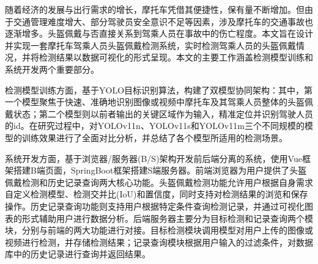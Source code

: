 随着经济的发展与出行需求的增长，摩托车凭借其便捷性，保有量不断增加。但由于交通管理难度增大、部分驾驶员安全意识不足等因素，涉及摩托车的交通事故也逐渐增多。头盔佩戴与否直接关系到驾乘人员在事故中的伤亡程度。本文旨在设计并实现一套摩托车驾乘人员头盔佩戴检测系统，实时检测驾乘人员的头盔佩戴情况，并将检测结果以数据可视化的形式呈现。本文的主要工作涵盖检测模型训练和系统开发两个重要部分。

检测模型训练方面，基于YOLO目标识别算法，构建了双模型协同架构：其中，第一个模型聚焦于快速、准确地识别图像或视频中摩托车及其驾乘人员整体的头盔佩戴状态；第二个模型则以前者输出的关键区域作为输入，精准定位并识别驾驶人员的id。在研究过程中，对YOLOv11n、YOLOv11s和YOLOv11m三个不同规模的模型的训练效果进行了全面对比分析，并总结了各个模型所适用的检测场景。

系统开发方面，基于浏览器/服务器(B/S)架构开发前后端分离的系统，使用Vue框架搭建B端页面，SpringBoot框架搭建S端服务器。前端浏览器为用户提供了头盔佩戴检测和历史记录查询两大核心功能。头盔佩戴检测功能允许用户根据自身需求自定义检测模型、检测交并比(IoU)和置信度，同时支持对检测结果的浏览和保存操作。历史记录查询功能则支持用户根据特定条件查询检测记录，并通过可视化图表的形式辅助用户进行数据分析。后端服务器主要分为目标检测和记录查询两个模块，分别与前端的两大功能进行对接。目标检测模块调用模型对用户上传的图像或视频进行检测，并存储检测结果；记录查询模块根据用户输入的过滤条件，对数据库中的历史记录进行查询并返回结果。